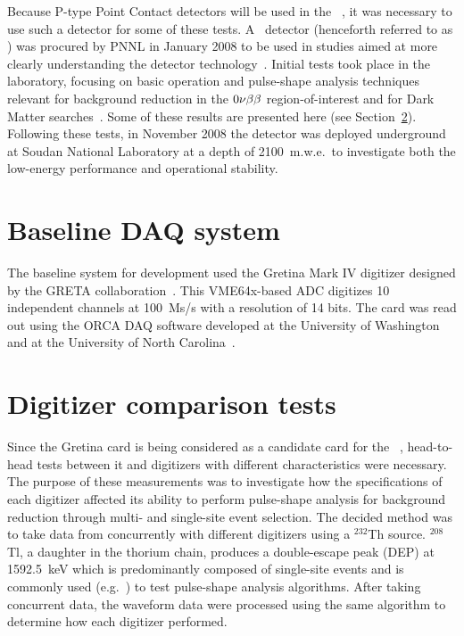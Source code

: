 	Because P-type Point Contact detectors will be used in the \MJ~\minmod, it was necessary to use such a detector for some of these tests.  A \ppc~detector (henceforth referred to as ) was procured by PNNL in January 2008 to be used in studies aimed at more clearly understanding the detector technology~\cite{Orr2007}.  Initial tests took place in the laboratory, focusing on basic operation and pulse-shape analysis techniques relevant for background reduction in the $0 \nu \beta \beta$ region-of-interest and for Dark Matter searches~\cite{Orr2008}.  Some of these results are presented here (see Section~\ref{sec:HeadToHeadCompare}).  Following these tests, in November 2008 the detector was deployed underground at Soudan National Laboratory at a depth of 2100~m.w.e.~to investigate both the low-energy performance and operational stability.
	   
	\section{Baseline DAQ system}

	The baseline system for development used the Gretina Mark IV digitizer
designed by the GRETA collaboration~\cite{Anderson:2009p1293}.  This
VME64x-based ADC digitizes 10 independent channels at 100~Ms/s with a
resolution of 14 bits.  The card was read out using the ORCA DAQ software
developed at the University of Washington and at the University of North
Carolina~\cite{Howe04,Howe08,ORCA}.%
	
	\section{Digitizer comparison tests}
     	\label{sec:HeadToHeadCompare}
	
	Since the Gretina card is being considered as a candidate card for the \MJ~\minmod, head-to-head tests between it and digitizers with different characteristics were necessary.  The purpose of these measurements was to investigate how the specifications of each digitizer affected its ability to perform pulse-shape analysis for background reduction through multi- and single-site event selection.  The decided method was to take data from  concurrently with different digitizers using a $^{232}$Th source.  $^{208}$Tl, a daughter in the thorium chain, produces a double-escape peak (DEP) at 1592.5~keV which is predominantly composed of single-site events and is commonly used (e.g.~\cite{Abt2007332,Orrell:2007tt}) to test pulse-shape analysis algorithms.  After taking concurrent data, the waveform data were processed using the same algorithm to determine how each digitizer performed.
	
